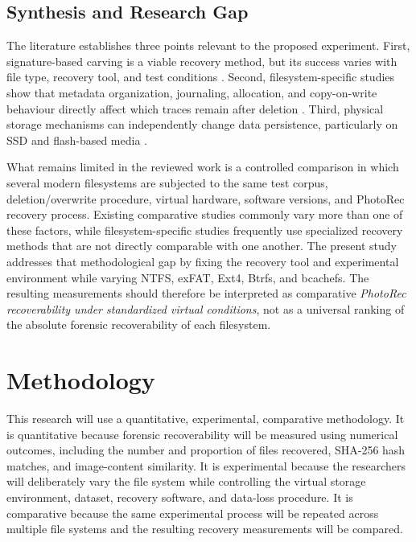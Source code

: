 \documentclass[conference]{IEEEtran}
\begin{document}
\subsection{Synthesis and Research Gap}

The literature establishes three points relevant to the proposed experiment. First, signature-based carving is a viable recovery method, but its success varies with file type, recovery tool, and test conditions \cite{pratama2021photorec,kumar2022docker}. Second, filesystem-specific studies show that metadata organization, journaling, allocation, and copy-on-write behaviour directly affect which traces remain after deletion \cite{venkatesh2024ntfs,kim2021ext4xfs,pandey2026btrfs}. Third, physical storage mechanisms can independently change data persistence, particularly on SSD and flash-based media \cite{iqbal2020ssdtrim,chen2022ransomware,chhajed2024persistence}.

What remains limited in the reviewed work is a controlled comparison in which several modern filesystems are subjected to the same test corpus, deletion/overwrite procedure, virtual hardware, software versions, and PhotoRec recovery process. Existing comparative studies commonly vary more than one of these factors, while filesystem-specific studies frequently use specialized recovery methods that are not directly comparable with one another. The present study addresses that methodological gap by fixing the recovery tool and experimental environment while varying NTFS, exFAT, Ext4, Btrfs, and bcachefs. The resulting measurements should therefore be interpreted as comparative \emph{PhotoRec recoverability under standardized virtual conditions}, not as a universal ranking of the absolute forensic recoverability of each filesystem.

\section{Methodology}
This research will use a quantitative, experimental, comparative methodology. It is quantitative because forensic recoverability will be measured using numerical outcomes, including the number and proportion of files recovered, SHA-256 hash matches, and image-content similarity. It is experimental because the researchers will deliberately vary the file system while controlling the virtual storage environment, dataset, recovery software, and data-loss procedure. It is comparative because the same experimental process will be repeated across multiple file systems and the resulting recovery measurements will be compared.
\end{document}
